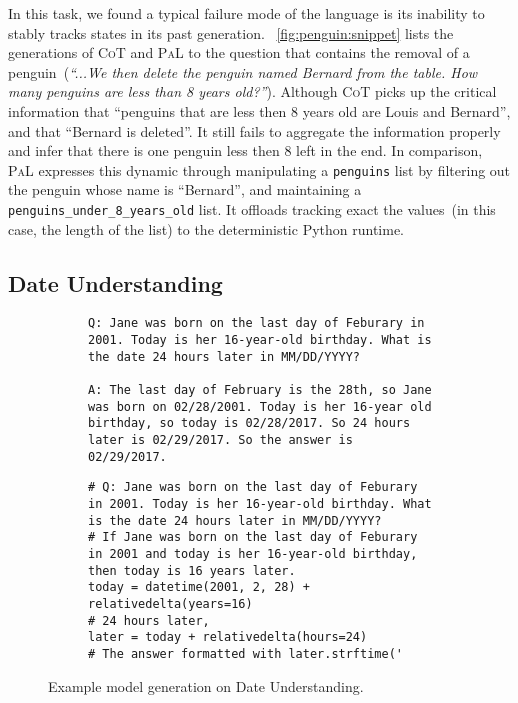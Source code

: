 \documentclass[dvipsnames]{article} \usepackage[accepted]{icml2022}
\newcommand{\ours}{\textsc{PaL}\xspace}
\newcommand{\inlineCode}[1]{\texttt{{#1}}}
\newcommand{\cotp}{\textsc{CoT}\xspace}
\begin{document}
In this task, we found a typical failure mode of the language is its inability to stably tracks states in its past generation. 
~\autoref{fig:penguin:snippet} lists the generations of \cotp and \ours to the question that contains the removal of a penguin~(\textit{``...We then delete the penguin named Bernard from the table. How many penguins are less than 8 years old?''}).
Although \cotp picks up the critical information that ``penguins that are less then 8 years old are Louis and Bernard'', and that ``Bernard is deleted''. It still fails to aggregate the information properly and infer that there is one penguin less then 8 left in the end. 
In comparison, \ours expresses this dynamic through manipulating a \inlineCode{penguins} list by filtering out the penguin whose name is ``Bernard'', and maintaining  a \inlineCode{penguins\_under\_8\_years\_old} list. It offloads tracking exact the values~(in this case, the length of the list) to the deterministic Python runtime.

\subsection{Date Understanding}
\label{app:sec:date}
\begin{figure*}[h!]
\centering
\begin{subfigure}[t]{.95\textwidth}
\centering
\begin{verbatim}
Q: Jane was born on the last day of Feburary in 2001. Today is her 16-year-old birthday. What is the date 24 hours later in MM/DD/YYYY?

A: The last day of February is the 28th, so Jane was born on 02/28/2001. Today is her 16-year old birthday, so today is 02/28/2017. So 24 hours later is 02/29/2017. So the answer is 02/29/2017.
\end{verbatim}
\label{fig:mainfig:list}
\end{subfigure}

\begin{subfigure}[t]{.95\textwidth}

 \begin{verbatim}
# Q: Jane was born on the last day of Feburary in 2001. Today is her 16-year-old birthday. What is the date 24 hours later in MM/DD/YYYY?
# If Jane was born on the last day of Feburary in 2001 and today is her 16-year-old birthday, then today is 16 years later.
today = datetime(2001, 2, 28) + relativedelta(years=16)
# 24 hours later,
later = today + relativedelta(hours=24)
# The answer formatted with later.strftime('\end{verbatim}
\end{subfigure}
\caption{Example model generation on Date Understanding.}
\label{fig:date:eggeneration}
 \end{figure*}
\end{document}
